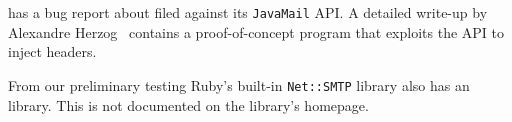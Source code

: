 

 has a bug report about \ehi filed against its \texttt{JavaMail} API. A detailed write-up by Alexandre Herzog~\cite{Herzog.2014} contains a proof-of-concept program that exploits the API to inject headers.

\begin{sloppypar}
From our preliminary testing Ruby's built-in \texttt{Net::SMTP} library also has an \ehi library. This is not documented on the library's homepage.
\end{sloppypar}
%


